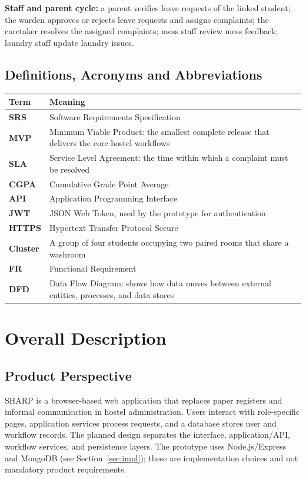 \documentclass[11pt,a4paper]{article}
\numberwithin{figure}{section}   %
\begin{document}
\textbf{Staff and parent cycle:} a parent verifies leave requests of the linked student; the warden approves or rejects leave requests and assigns complaints; the caretaker resolves the assigned complaints; mess staff review mess feedback; laundry staff update laundry issues.

\subsection{Definitions, Acronyms and Abbreviations}
\begin{longtable}{>{\bfseries}p{}p{}}
\toprule
Term & Meaning\\
\midrule
\endhead
SRS & Software Requirements Specification\\
MVP & Minimum Viable Product: the smallest complete release that delivers the core hostel workflows\\
SLA & Service Level Agreement: the time within which a complaint must be resolved\\
CGPA & Cumulative Grade Point Average\\
API & Application Programming Interface\\
JWT & JSON Web Token, used by the prototype for authentication\\
HTTPS & Hypertext Transfer Protocol Secure\\
Cluster & A group of four students occupying two paired rooms that share a washroom\\
FR & Functional Requirement\\
DFD & Data Flow Diagram: shows how data moves between external entities, processes, and data stores\\
\bottomrule
\end{longtable}

\section{Overall Description}
\subsection{Product Perspective}
SHARP is a browser-based web application that replaces paper registers and informal communication in hostel administration. Users interact with role-specific pages, application services process requests, and a database stores user and workflow records. The planned design separates the interface, application/API, workflow services, and persistence layers. The prototype uses Node.js/Express and MongoDB (see Section~\ref{sec:impl}); these are implementation choices and not mandatory product requirements.
\end{document}
